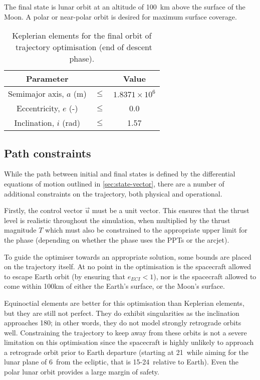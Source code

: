 The final state is lunar orbit at an altitude of 100~km above the surface of the Moon. A polar or near-polar orbit is desired for maximum surface coverage.

\begin{table}[h]
\caption{Keplerian elements for the final orbit of \BW\ trajectory optimisation (end of descent phase).} \label{tab:Phase-5-constraints}
\centering
\begin{tabular} {ccc}\toprule
Parameter && Value\\\midrule
Semimajor axis, $a$ (m) &$\le$& $1.8371\times 10^6$\\
Eccentricity, $e$ (-) &$\le$& 0.0\\
Inclination, $i$ (rad) &$\le$& 1.57\\\bottomrule
\end{tabular}
\end{table}

\subsection{Path constraints} \label{sub:Path-constraints}

While the path between initial and final states is defined by the differential equations of motion outlined in \autoref{sec:state-vector}, there are a number of additional constraints on the trajectory, both physical and operational.

Firstly, the control vector $\vec{u}$ must be a unit vector. This ensures that the thrust level is realistic throughout the simulation, when multiplied by the thrust magnitude $T$ which must also be constrained to the appropriate upper limit for the phase (depending on whether the phase uses the PPTs or the arcjet).

To guide the optimiser towards an appropriate solution, some bounds are placed on the trajectory itself. At no point in the optimisation is the spacecraft allowed to escape Earth orbit (by ensuring that $e_{ECI}<1$), nor is the spacecraft allowed to come within 100km of either the Earth's surface, or the Moon's surface.

Equinoctial elements are better for this optimisation than Keplerian elements, but they are still not perfect. They do exhibit singularities as the inclination approaches 180\degrees; in other words, they do not model strongly retrograde orbits well. Constraining the trajectory to keep away from these orbits is not a severe limitation on this optimisation since the spacecraft is highly unlikely to approach a retrograde orbit prior to Earth departure (starting at 21\degrees\ while aiming for the lunar plane of 6\degrees\ from the ecliptic, that is 15-24\degrees\ relative to Earth). Even the polar lunar orbit provides a large margin of safety.

